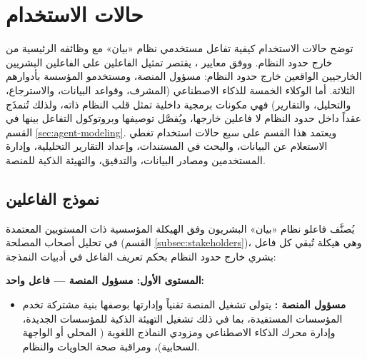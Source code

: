 \section{حالات الاستخدام}
\label{sec:use-cases}

توضح حالات الاستخدام كيفية تفاعل مستخدمي نظام «بيان» مع وظائفه الرئيسية من خارج حدود النظام. ووفق معايير ، يقتصر تمثيل الفاعلين  على الفاعلين البشريين الخارجيين الواقعين خارج حدود النظام: مسؤول المنصة، ومستخدمو المؤسسة بأدوارهم الثلاثة. أما الوكلاء الخمسة للذكاء الاصطناعي (المشرف، وقواعد البيانات، والاسترجاع، والتحليل، والتقارير) فهي مكونات برمجية داخلية تمثل قلب النظام ذاته، ولذلك تُنمذَج عقداً  داخل حدود النظام لا فاعلين خارجها، ويُفصَّل توصيفها وبروتوكول التفاعل بينها في القسم \ref{sec:agent-modeling}. ويعتمد هذا القسم على سبع حالات استخدام تغطي الاستعلام عن البيانات، والبحث في المستندات، وإعداد التقارير التحليلية، وإدارة المستخدمين ومصادر البيانات، والتدقيق، والتهيئة الذكية للمنصة.

\subsection{نموذج الفاعلين}
\label{subsec:actor-model}

يُصنَّف فاعلو نظام «بيان» البشريون وفق الهيكلة المؤسسية ذات المستويين المعتمدة في تحليل أصحاب المصلحة (القسم \ref{subsec:stakeholders})، وهي هيكلة تُبقي كل فاعل بشري خارج حدود النظام بحكم تعريف الفاعل في أدبيات النمذجة:

\textbf{المستوى الأول: مسؤول المنصة  --- فاعل واحد:}

\begin{itemize}[label={\textbullet},leftmargin=*,itemsep=4pt]
  \item \textbf{مسؤول المنصة :} يتولى تشغيل المنصة تقنياً وإدارتها بوصفها بنية مشتركة تخدم المؤسسات المستفيدة، بما في ذلك تشغيل التهيئة الذكية للمؤسسات الجديدة، وإدارة محرك الذكاء الاصطناعي ومزودي النماذج اللغوية ( المحلي أو الواجهة السحابية)، ومراقبة صحة الحاويات والنظام.
\end{itemize}

